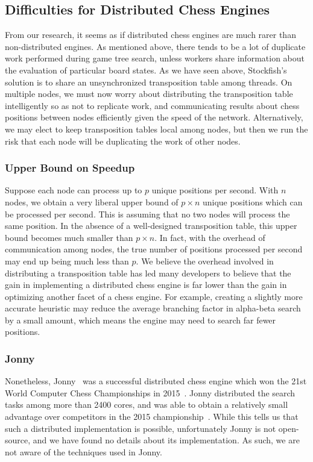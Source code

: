 \documentclass{article}
\begin{document}
\subsection{Difficulties for Distributed Chess Engines}
From our research, it seems as if distributed chess engines are much rarer than
non-distributed engines. 
As mentioned above, there tends to be a lot of duplicate work performed during
game tree search, unless workers share information about the evaluation of
particular board states. As we have seen above, Stockfish's
solution is to share an unsynchronized transposition table among threads. On
multiple nodes, we must now worry about distributing the transposition table
intelligently so as not to replicate work, and communicating results about chess positions between
nodes efficiently given the speed of the network. Alternatively, we may elect
to keep transposition tables local among nodes, but then we run the risk that
each node will be duplicating the work of other nodes.

\subsubsection{Upper Bound on Speedup}
Suppose each node can process up to $p$ unique positions per second. With $n$ nodes, we
obtain a very liberal upper bound of $p\times n$ unique positions which can be processed per
second. This is assuming that no two nodes will process the same position. In
the absence of a well-designed transposition table, this upper bound becomes
much smaller than $p \times n$. In fact, with the overhead of communication
among nodes, the true number of positions processed per second may end up being
much less than $p$. We believe the overhead involved in distributing a
transposition table has led many developers to believe that the gain in
implementing a distributed chess engine is far lower than the gain in
optimizing another facet of a chess engine. For example, creating a slightly
more accurate heuristic may reduce the average branching factor in alpha-beta
search by a small amount, which means the engine may need to search far fewer
positions.

\subsubsection{Jonny}
Nonetheless, Jonny~\cite{wiki:Jonny} was a successful distributed chess engine
which won the 21st World Computer Chess Championships in 2015~\cite{WCCC15}.
Jonny distributed the search tasks among more than 2400 cores, and was able to
obtain a relatively small advantage over competitors in the 2015
championship~\cite{WCCC15}.
While this tells us that such a distributed implementation is possible,
unfortunately Jonny is not open-source, and we have found no details about its
implementation. As such, we are not aware of the techniques used in Jonny.
\end{document}
